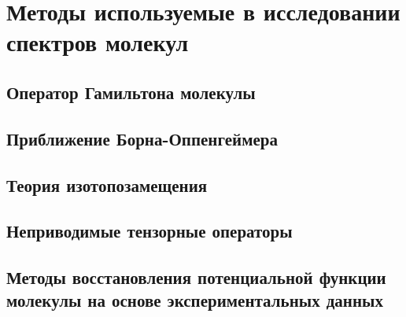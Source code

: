 \chapter{Методы используемые в исследовании спектров молекул}\label{ch:methods}

\section{Оператор Гамильтона молекулы}\label{sec:methods/hamilton}

\section{Приближение Борна-Оппенгеймера}\label{sec:methods/born-openhimer}

\section{Теория изотопозамещения}\label{sec:methods/isotop-sub}

\section{Неприводимые тензорные операторы}\label{sec:methods/tensor-op}

\section{Методы восстановления потенциальной функции молекулы на основе экспериментальных данных}\label{sec:methods/pot-function}